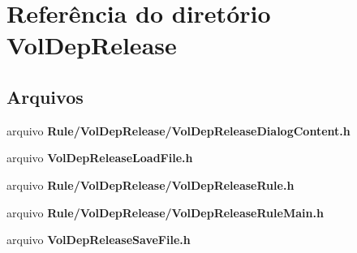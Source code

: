 \section{Referência do diretório Vol\+Dep\+Release}
\label{dir_1ed16de1ce0188ced59db4391e990643}
\subsection*{Arquivos}
\begin{DoxyCompactItemize}
\item 
arquivo {\bf Rule/\+Vol\+Dep\+Release/\+Vol\+Dep\+Release\+Dialog\+Content.\+h}
\item 
arquivo {\bf Vol\+Dep\+Release\+Load\+File.\+h}
\item 
arquivo {\bf Rule/\+Vol\+Dep\+Release/\+Vol\+Dep\+Release\+Rule.\+h}
\item 
arquivo {\bf Rule/\+Vol\+Dep\+Release/\+Vol\+Dep\+Release\+Rule\+Main.\+h}
\item 
arquivo {\bf Vol\+Dep\+Release\+Save\+File.\+h}
\end{DoxyCompactItemize}
